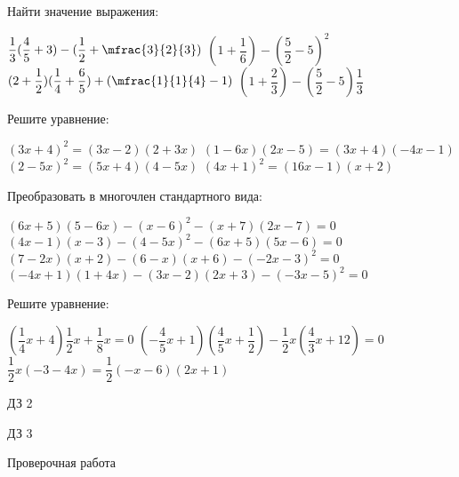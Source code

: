 \begin{homework}[number=1]
	\begin{listofex}
		\item Найти значение выражения:
		\begin{itasks}[1]
			\task \( \dfrac{1}{3}(\dfrac{4}{5}+3)-(\dfrac{1}{2}+\mfrac{3}{2}{3}) \)
			\task \( (1+\dfrac{1}{6})-(\dfrac{5}{2}-5)^2 \)
			\task \( (2+\dfrac{1}{2})(\dfrac{1}{4}+\dfrac{6}{5})+(\mfrac{1}{1}{4}-1) \)
			\task \( (1+\dfrac{2}{3})-(\dfrac{5}{2}-5)\dfrac{1}{3} \)
		\end{itasks}
		\item Решите уравнение:
		\begin{itasks}[1]
			\task \( (3x+4)^2=(3x-2)(2+3x) \)
			\task \( (1-6x)(2x-5)=(3x+4)(-4x-1) \)
			\task \( (2-5x)^2=(5x+4)(4-5x)\)
			\task \( (4x+1)^2=(16x-1)(x+2) \)
		\end{itasks}
		\item Преобразовать в многочлен стандартного вида:
		\begin{itasks}[1]
			\task \( (6x+5)(5-6x)-(x-6)^2-(x+7)(2x-7)=0 \)
			\task \( (4x-1)(x-3)-(4-5x)^2-(6x+5)(5x-6)=0 \)
			\task \( (7-2x)(x+2)-(6-x)(x+6)-(-2x-3)^2=0 \)
			\task \( (-4x+1)(1+4x)-(3x-2)(2x+3)-(-3x-5)^2=0 \)
		\end{itasks}
		\item Решите уравнение:
		\begin{itasks}[1]
			\task \( (\dfrac{1}{4}x+4)\dfrac{1}{2}x+\dfrac{1}{8}x=0 \)
			\task \( (-\dfrac{4}{5}x+1)(\dfrac{4}{5}x+\dfrac{1}{2})- \dfrac{1}{2}x (\dfrac{4}{3}x+12)=0 \)
			\task \( \dfrac{1}{2}x(-3-4x)=\dfrac{1}{2}(-x-6)(2x+1) \)
		\end{itasks} 
	\end{listofex}
\end{homework}

\begin{homework}[number=2]
	\begin{listofex}
		\item ДЗ 2
	\end{listofex}
\end{homework}

\begin{homework}[number=3]
	\begin{listofex}
		\item ДЗ 3
	\end{listofex}
\end{homework}

\begin{exam}
	\begin{listofex}
		\item Проверочная работа
	\end{listofex}
\end{exam}
